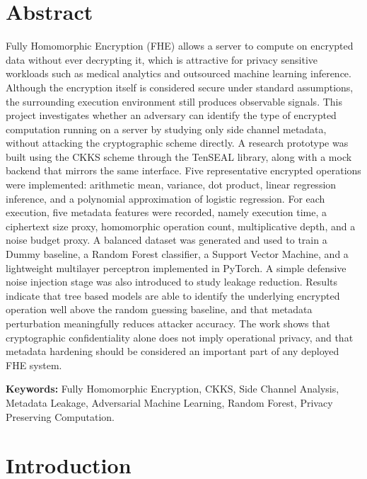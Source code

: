 \documentclass[12pt,a4paper]{article}
\begin{document}
\section*{Abstract}
Fully Homomorphic Encryption (FHE) allows a server to compute on encrypted data without ever decrypting it, which is attractive for privacy sensitive workloads such as medical analytics and outsourced machine learning inference. Although the encryption itself is considered secure under standard assumptions, the surrounding execution environment still produces observable signals. This project investigates whether an adversary can identify the type of encrypted computation running on a server by studying only side channel metadata, without attacking the cryptographic scheme directly. A research prototype was built using the CKKS scheme through the TenSEAL library, along with a mock backend that mirrors the same interface. Five representative encrypted operations were implemented: arithmetic mean, variance, dot product, linear regression inference, and a polynomial approximation of logistic regression. For each execution, five metadata features were recorded, namely execution time, a ciphertext size proxy, homomorphic operation count, multiplicative depth, and a noise budget proxy. A balanced dataset was generated and used to train a Dummy baseline, a Random Forest classifier, a Support Vector Machine, and a lightweight multilayer perceptron implemented in PyTorch. A simple defensive noise injection stage was also introduced to study leakage reduction. Results indicate that tree based models are able to identify the underlying encrypted operation well above the random guessing baseline, and that metadata perturbation meaningfully reduces attacker accuracy. The work shows that cryptographic confidentiality alone does not imply operational privacy, and that metadata hardening should be considered an important part of any deployed FHE system.

\vspace{0.1in}
\noindent\textbf{Keywords:} Fully Homomorphic Encryption, CKKS, Side Channel Analysis, Metadata Leakage, Adversarial Machine Learning, Random Forest, Privacy Preserving Computation.

\newpage

\section{Introduction}
\end{document}
